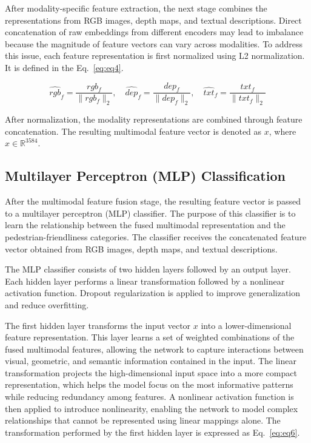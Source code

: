 \documentclass[11pt]{article}
\begin{document}
After modality-specific feature extraction, the next stage combines the representations from RGB images, depth maps, and textual descriptions. Direct concatenation of raw embeddings from different encoders may lead to imbalance because the magnitude of feature vectors can vary across modalities. To address this issue, each feature representation is first normalized using L2 normalization. It is defined in the Eq.~\ref{eq:eq4}.

\begin{equation}
\hat{rgb}_f = \frac{rgb_f}{\|rgb_f\|_2}, \quad
\hat{dep}_f = \frac{dep_f}{\|dep_f\|_2}, \quad
\hat{txt}_f = \frac{txt_f}{\|txt_f\|_2}
\label{eq:eq4}
\end{equation}

\noindent After normalization, the modality representations are combined through feature concatenation. The resulting multimodal feature vector is denoted as \(x\), where \(x \in \mathbb{R}^{3584}\).

\subsection{Multilayer Perceptron (MLP) Classification}

After the multimodal feature fusion stage, the resulting feature vector is passed to a multilayer perceptron (MLP) classifier. The purpose of this classifier is to learn the relationship between the fused multimodal representation and the pedestrian-friendliness categories. The classifier receives the concatenated feature vector obtained from RGB images, depth maps, and textual descriptions.

\noindent The MLP classifier consists of two hidden layers followed by an output layer. Each hidden layer performs a linear transformation followed by a nonlinear activation function. Dropout regularization is applied to improve generalization and reduce overfitting.

\noindent The first hidden layer transforms the input vector \(x\) into a lower-dimensional feature representation. This layer learns a set of weighted combinations of the fused multimodal features, allowing the network to capture interactions between visual, geometric, and semantic information contained in the input. The linear transformation projects the high-dimensional input space into a more compact representation, which helps the model focus on the most informative patterns while reducing redundancy among features. A nonlinear activation function is then applied to introduce nonlinearity, enabling the network to model complex relationships that cannot be represented using linear mappings alone. The transformation performed by the first hidden layer is expressed as Eq.~\ref{eq:eq6}.
\end{document}
